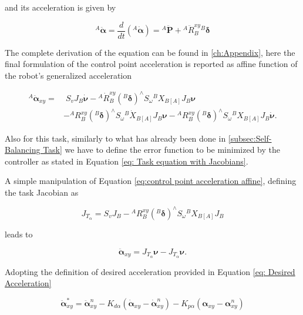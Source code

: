 and its acceleration is given by

\begin{equation}
{}^{A} \ddot{\bm{\alpha}} = \frac{d}{dt} ({}^{A} \bm{\dot{\alpha}}) = {}^{A} \ddot{\mathbf{P}} + {}^{A} \ddot{R}^{xy}_{B} {}^{B} \bm{\delta}
\label{eq:control point acceleration} 
\end{equation}

The complete derivation of the equation can be found in \cref{ch:Appendix}, here the final formulation of the control point acceleration is reported as affine function of the robot's generalized acceleration

\begin{equation}
\begin{aligned}
{}^{A} \ddot{\bm{\alpha}}_{xy} = & \; S_{v}J_{B}\dot{\bm{\nu}} - {}^{A} \dot{R}^{xy}_{B} ({}^{B}\bm{\delta}) ^\wedge S_{\omega}{}^{B}X_{B[A]}J_{B} \bm{\nu} \\
& - {}^{A} R^{xy}_{B}({}^{B}\bm{\delta})^\wedge S_{\omega}{}^{B} \dot{X}_{B[A]}J_{B} \bm{\nu} - {}^{A} R^{xy}_{B}({}^{B}\bm{\delta})^\wedge S_{\omega}{}^{B}X_{B[A]}J_{B} \dot{\bm{\nu}}.
\end{aligned}
\label{eq:control point acceleration affine}
\end{equation}

Also for this task, similarly to what has already been done in \cref{subsec:Self-Balancing Task} we have to define the error function to be minimized by the controller as stated in Equation \eqref{eq: Task equation with Jacobians}.

A simple manipulation of Equation \eqref{eq:control point acceleration affine}, defining the task Jacobian as

\begin{equation}
    J_{T_{\alpha}} = S_{v}J_{B} - {}^{A} R^{xy}_{B}({}^{B}\bm{\delta})^\wedge S_{\omega}{}^{B}X_{B[A]}J_{B}
    \label{eq: Tracking Task Jacobian}
\end{equation}

leads to 

\begin{equation*}
     \ddot{\bm{\alpha}}_{xy} = J_{T_{\alpha}}{\bm{\nu}} - J_{T_{\alpha}}\bm{\nu}.
\end{equation*}

Adopting the definition of desired acceleration provided in Equation \eqref{eq: Desired Acceleration}

\begin{equation}
    \ddot{\bm{\alpha}}_{xy}^{*} = \ddot{\bm{\alpha}}_{xy}^{n} -K_{d\alpha}(\dot{\bm{\alpha}}_{xy}-\dot{\bm{\alpha}}_{xy}^{n}) -K_{p\alpha}(\bm{\alpha}_{xy} - \bm{\alpha}_{xy}^{n})
    \label{eq: Alpha Desired Acceleration}
\end{equation}

